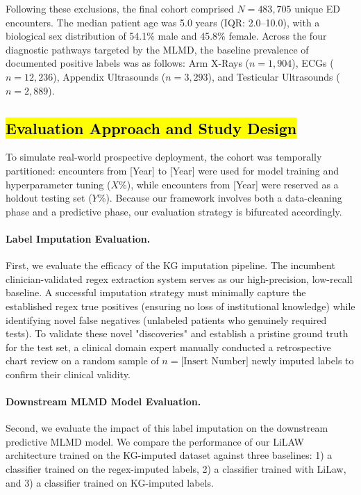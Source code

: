 \documentclass[pmlr]{jmlr}%
\begin{document}
Following these exclusions, the final cohort comprised $N = 483,705$ unique ED encounters. The median patient age was 5.0 years (IQR: 2.0–10.0), with a biological sex distribution of 54.1\% male and 45.8\% female. Across the four diagnostic pathways targeted by the MLMD, the baseline prevalence of documented positive labels was as follows: Arm X-Rays ($n = 1,904$), ECGs ($n = 12,236$), Appendix Ultrasounds ($n = 3,293$), and Testicular Ultrasounds ($n = 2,889$).

\subsection{\hl{Evaluation Approach and Study Design}}
To simulate real-world prospective deployment, the cohort was temporally partitioned: encounters from [Year] to [Year] were used for model training and hyperparameter tuning ($X$\%), while encounters from [Year] were reserved as a holdout testing set ($Y$\%). Because our framework involves both a data-cleaning phase and a predictive phase, our evaluation strategy is bifurcated accordingly.

\paragraph{Label Imputation Evaluation.}
First, we evaluate the efficacy of the KG imputation pipeline. The incumbent clinician-validated regex extraction system serves as our high-precision, low-recall baseline. A successful imputation strategy must minimally capture the established regex true positives (ensuring no loss of institutional knowledge) while identifying novel false negatives (unlabeled patients who genuinely required tests). To validate these novel "discoveries" and establish a pristine ground truth for the test set, a clinical domain expert manually conducted a retrospective chart review on a random sample of $n = \text{[Insert Number]}$ newly imputed labels to confirm their clinical validity.

\paragraph{Downstream MLMD Model Evaluation.}
Second, we evaluate the impact of this label imputation on the downstream predictive MLMD model. We compare the performance of our LiLAW architecture trained on the KG-imputed dataset against three baselines: 1) a classifier trained on the regex-imputed labels, 2) a classifier trained with LiLaw, and 3) a classifier trained on KG-imputed labels.
\end{document}
